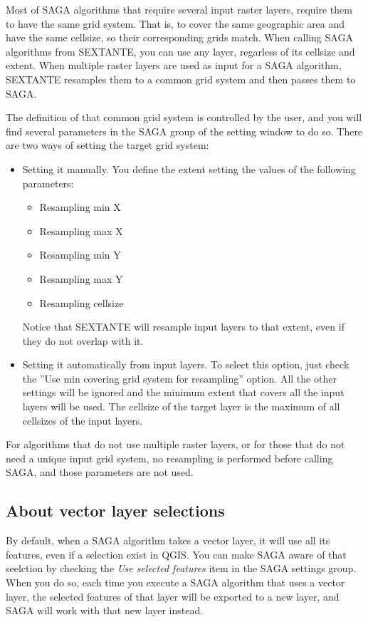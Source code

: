 Most of SAGA algorithms that require several input raster layers, require them to have the same grid system. That is, to cover the same geographic area and have the same cellsize, so their corresponding grids match. When calling SAGA algorithms from SEXTANTE, you can use any layer, regarless of its cellsize and extent. When multiple raster layers are used as input for a SAGA algorithm, SEXTANTE resamples them to a common grid system and then passes them to SAGA.

The definition of that common grid system is controlled by the user, and you will find several parameters in the SAGA group of the setting window to do so. There are two ways of setting the target grid system:

\begin{itemize}
	\item{Setting it manually}. You define the extent setting the values of the following parameters:
	\begin{itemize}
		\item Resampling min X
		\item Resampling max X
		\item Resampling min Y
		\item Resampling max Y
		\item Resampling cellsize
	\end{itemize}
	Notice that SEXTANTE will resample input layers to that extent, even if they do not overlap with it.
	\item Setting it automatically from input layers. To select this option, just check the ''Use min covering grid system for resampling'' option. All the other settings will be ignored and the minimum extent that covers all the input layers will be used. The cellsize of the target layer is the maximum of all cellsizes of the input layers.
\end{itemize}

For algorithms that do not use multiple raster layers, or for those that do not need a unique input grid system, no resampling is performed before calling SAGA, and those parameters are not used.

\subsection{About vector layer selections}

By default, when a SAGA algorithm takes a vector layer, it will use all its features, even if a selection exist in QGIS. You can make SAGA aware of that seelction by checking the \emph{Use selected features} item in the SAGA settings group. When you do so, each time you execute a SAGA algorithm that uses a vector layer, the selected features of that layer will be exported to a new layer, and SAGA will work with that new layer instead.

